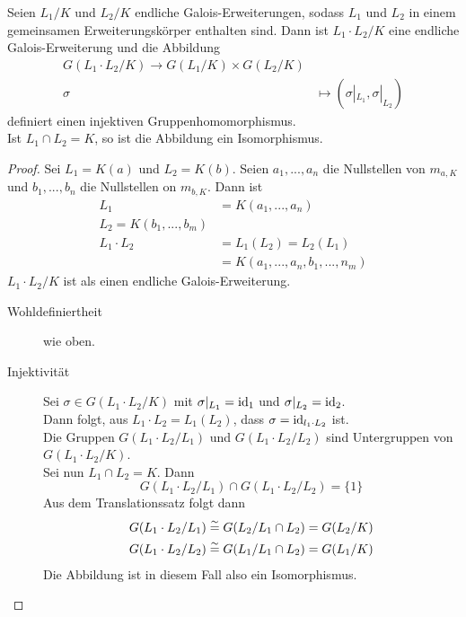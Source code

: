 	\begin{theorem}[Produktsatz]
		Seien $L_1/K$ und $L_2/K$ endliche Galois-Erweiterungen, sodass $L_1$ und $L_2$ in einem gemeinsamen Erweiterungskörper enthalten sind. Dann ist ${L_1\cdot L_2}/K$ eine endliche Galois-Erweiterung und die Abbildung
		\begin{align*}
		G({L_1\cdot L_2}/K)\to G(L_1/K)\times G(L_2/K)\\
		\sigma&\mapsto(\sigma|_{L_1},\sigma|_{L_2})
		\end{align*}
		definiert einen injektiven Gruppenhomomorphismus.\\
		Ist $L_1\cap L_2=K$, so ist die Abbildung ein Isomorphismus.
	\end{theorem}
	\begin{proof}
		Sei $L_1=K(a)$ und $L_2=K(b)$. Seien $a_1,...,a_n$ die Nullstellen von $m_{a,K}$ und $b_1,...,b_n$ die Nullstellen on $m_{b,K}$. Dann ist
		\begin{align*}
		L_1&=K(a_1,...,a_n)\\
		L_2=K(b_1,...,b_m)\\
		L_1\cdot L_2&=L_1(L_2)=L_2(L_1)\\
		&=K(a_1,...,a_n,b_1,...,n_m)
		\end{align*}
		${L_1\cdot L_2}/K$ ist als einen endliche Galois-Erweiterung.\\
		\begin{description}
			\item[Wohldefiniertheit] wie oben.
			\item[Injektivität] Sei $\sigma\in G({L_1\cdot L_2}/K)$ mit $\sigma|_{L_1}=\operatorname{id}_1$ und $\sigma|_{L_2}=\operatorname{id}_2$.\\
			Dann folgt, aus $L_1\cdot L_2=L_1(L_2)$, dass $\sigma=\operatorname{id}_{l_1\cdot L_2}$ ist.\\
			Die Gruppen $G({L_1\cdot L_2}/L_1)$ und $G({L_1\cdot L_2}/L_2)$ sind Untergruppen von $G({L_1\cdot L_2}/K)$.\\
			Sei nun $L_1\cap L_2=K$. Dann
			\[G({L_1\cdot L_2}/L_1)\cap G({L_1\cdot L_2}/L_2)=\{1\}\]
			Aus dem Translationssatz folgt dann
			\begin{align*}
			G({L_1\cdot L_2}/L_1)&\overset{\sim}{=} G(L_2/{L_1\cap L_2}) = G(L_2/K)\\
			G({L_1\cdot L_2}/L_2)&\overset{\sim}{=} G(L_1/{L_1\cap L_2}) = G(L_1/K)
			\end{align*}
			Die Abbildung ist in diesem Fall also ein Isomorphismus.
		\end{description}
	\end{proof}

